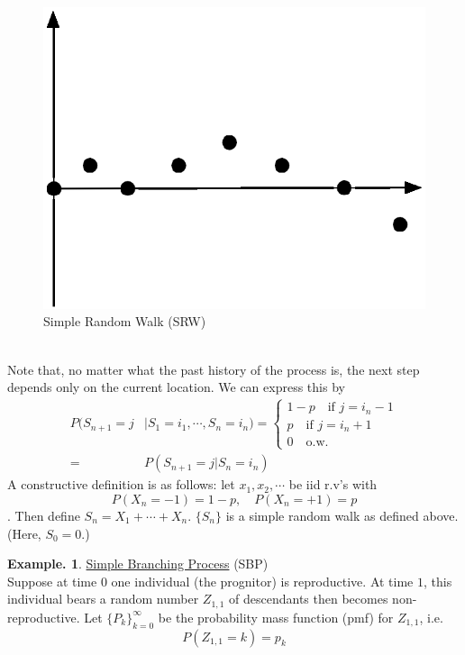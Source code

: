 \documentclass[12pt]{article}
\theoremstyle{definition}
\newtheorem{myexp}{Example.}[section]
\theoremstyle{plain}
\begin{document}
\begin{figure}[h]
\centering
\includegraphics[scale=.5]{SRW.eps}
\caption{Simple Random Walk (SRW)}
\label{1:SRW}
\end{figure}
$\mbox{}$\\
Note that, no matter what the past history of the process is, the next step depends only on the current location. We can express this by
\begin{displaymath}
\begin{aligned}
P(S_{n+1} = j &| S_1 = i_1, \cdots, S_n = i_n) = \begin{cases} 1- p \quad \mbox{if $j = i_n - 1$}\\ p \quad \mbox{if $j = i_n + 1$}\\ 0 \quad \mbox{o.w.} \end{cases}\\  =& P(S_{n+1} = j | S_n = i_n) 
\end{aligned}
\end{displaymath}
A constructive definition is as follows: let $x_1, x_2, \cdots$ be iid r.v's with \[P(X_n = -1) = 1-p, \quad P(X_n = +1)=p\]. Then define $S_n = X_1 + \cdots + X_n$. $\{S_n\}$ is a simple random walk as defined above. (Here, $S_0 = 0$.)
\begin{myexp}
\underline{Simple Branching Process} (SBP) \\
Suppose at time $0$ one individual (the prognitor) is reproductive. At time $1$, this individual bears a random number $Z_{1,1}$ of descendants then becomes non-reproductive. Let $\{P_k\}_{k=0}^\infty$ be the probability mass function (pmf) for $Z_{1,1}$, i.e. \[P(Z_{1,1} = k) = p_k\]
\end{myexp}
\end{document}
